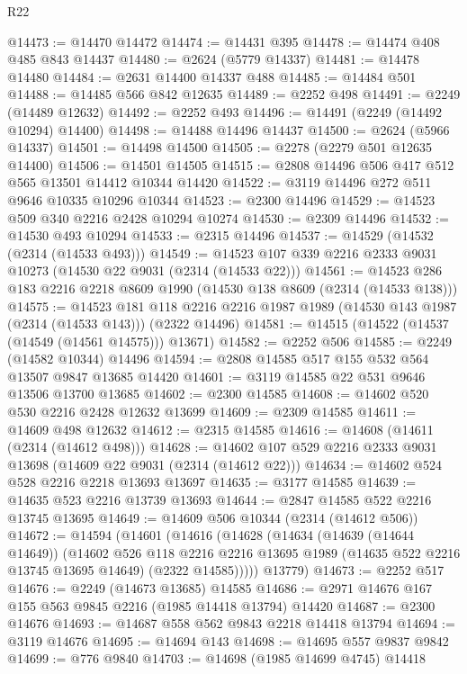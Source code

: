 \begin{lexlean}{R22}
\begin{coremodule}
@14473 := @14470 @14472
@14474 := @14431 @395
@14478 := @14474 @408 @485 @843 @14437
@14480 := @2624 (@5779 @14337)
@14481 := @14478 @14480
@14484 := @2631 @14400 @14337 @488
@14485 := @14484 @501
@14488 := @14485 @566 @842 @12635
@14489 := @2252 @498
@14491 := @2249 (@14489 @12632)
@14492 := @2252 @493
@14496 := @14491 (@2249 (@14492 @10294) @14400)
@14498 := @14488 @14496 @14437
@14500 := @2624 (@5966 @14337)
@14501 := @14498 @14500
@14505 := @2278 (@2279 @501 @12635 @14400)
@14506 := @14501 @14505
@14515 := @2808 @14496 @506 @417 @512 @565 @13501 @14412 @10344 @14420
@14522 := @3119 @14496 @272 @511 @9646 @10335 @10296 @10344
@14523 := @2300 @14496
@14529 := @14523 @509 @340 @2216 @2428 @10294 @10274
@14530 := @2309 @14496
@14532 := @14530 @493 @10294
@14533 := @2315 @14496
@14537 := @14529 (@14532 (@2314 (@14533 @493)))
@14549 := @14523 @107 @339 @2216 @2333 @9031 @10273 (@14530 @22 @9031 (@2314 (@14533 @22)))
@14561 := @14523 @286 @183 @2216 @2218 @8609 @1990 (@14530 @138 @8609 (@2314 (@14533 @138)))
@14575 := @14523
    @181
    @118
    @2216
    @2216
    @1987
    @1989
    (@14530 @143 @1987 (@2314 (@14533 @143)))
    (@2322 @14496)
@14581 := @14515 (@14522 (@14537 (@14549 (@14561 @14575))) @13671)
@14582 := @2252 @506
@14585 := @2249 (@14582 @10344) @14496
@14594 := @2808 @14585 @517 @155 @532 @564 @13507 @9847 @13685 @14420
@14601 := @3119 @14585 @22 @531 @9646 @13506 @13700 @13685
@14602 := @2300 @14585
@14608 := @14602 @520 @530 @2216 @2428 @12632 @13699
@14609 := @2309 @14585
@14611 := @14609 @498 @12632
@14612 := @2315 @14585
@14616 := @14608 (@14611 (@2314 (@14612 @498)))
@14628 := @14602 @107 @529 @2216 @2333 @9031 @13698 (@14609 @22 @9031 (@2314 (@14612 @22)))
@14634 := @14602 @524 @528 @2216 @2218 @13693 @13697
@14635 := @3177 @14585
@14639 := @14635 @523 @2216 @13739 @13693
@14644 := @2847 @14585 @522 @2216 @13745 @13695
@14649 := @14609 @506 @10344 (@2314 (@14612 @506))
@14672 := @14594
    (@14601
      (@14616
        (@14628
          (@14634
            (@14639 (@14644 @14649))
            (@14602
              @526
              @118
              @2216
              @2216
              @13695
              @1989
              (@14635 @522 @2216 @13745 @13695 @14649)
              (@2322 @14585)))))
      @13779)
@14673 := @2252 @517
@14676 := @2249 (@14673 @13685) @14585
@14686 := @2971 @14676 @167 @155 @563 @9845 @2216 (@1985 @14418 @13794) @14420
@14687 := @2300 @14676
@14693 := @14687 @558 @562 @9843 @2218 @14418 @13794
@14694 := @3119 @14676
@14695 := @14694 @143
@14698 := @14695 @557 @9837 @9842
@14699 := @776 @9840
@14703 := @14698 (@1985 @14699 @4745) @14418

\end{coremodule}
\end{lexlean}
